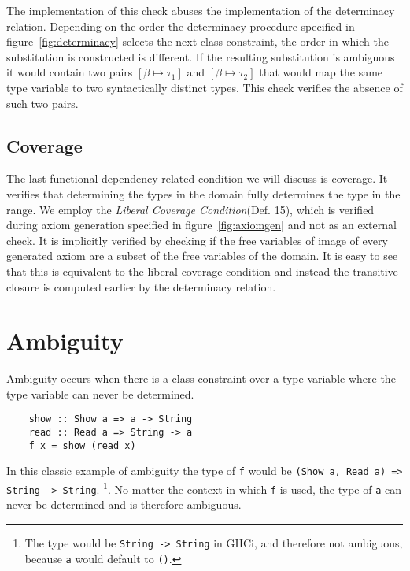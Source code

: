 The implementation of this check abuses the implementation of the determinacy
relation. Depending on the order the determinacy procedure specified in
figure~\ref{fig:determinacy} selects the next class constraint, the order in
which the substitution is constructed is different. If the resulting
substitution is ambiguous it would contain two pairs $[\beta \mapsto \tau_1]$
and $[\beta \mapsto \tau_2]$ that would map the same type variable to two
syntactically distinct types. This check verifies the absence of such two pairs.


\subsection{Coverage}
\label{sec:coverage}

The last functional dependency related condition we will discuss is coverage.
It verifies that determining the types in the domain fully determines the type
in the range. We employ the \textit{Liberal Coverage Condition}(Def.
15\cite{fundeps-chrs}), which is verified during axiom generation specified in
figure~\ref{fig:axiomgen} and not as an external check. It is implicitly
verified by checking if the free variables of image of every generated axiom are
a subset of the free variables of the domain. It is easy to see that this is
equivalent to the liberal coverage condition and instead the transitive closure
is computed earlier by the determinacy relation.



\section{Ambiguity}

Ambiguity occurs when there is a class constraint over a type variable where the
type variable can never be determined.

\begin{verbatim}
    show :: Show a => a -> String
    read :: Read a => String -> a
    f x = show (read x)
\end{verbatim}

In this classic example of ambiguity the type of \texttt{f} would be
\texttt{(Show a, Read a) => String -> String}. \footnote{The type would be
\texttt{String -> String} in GHCi, and therefore not ambiguous, because
\texttt{a} would default to \texttt{()}.}. No matter the context in which
\texttt{f} is used, the type of \texttt{a} can never be determined and is
therefore ambiguous.

